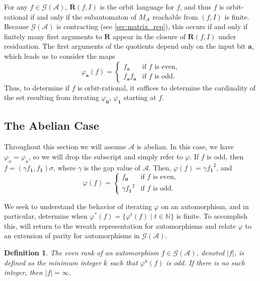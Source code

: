 \documentclass[12pt, letterpaper]{article}
\newcommand{\N}{\mathbb N}
\newcommand{\A}{\mathcal A}
\newcommand{\ch}[1]{\mathbf{#1}}
\newcommand{\res}[2]{{{#1}_{\ch{#2}}}}
\newcommand{\gp}{\mathcal G}
\newcommand{\R}{\mathbf R}
\newcommand{\f}[1]{\overline{#1}}
\newcommand{\rk}[1]{\left|#1\right|}
\newtheorem{defn}[thm]{Definition}
\begin{document}
For any $f \in \gp(\A)$, $\R(f, I)$ is the orbit language for $f$, and thus $f$
is orbit-rational if and only if the subautomaton of $M_\A$ reachable from $(f,
I)$ is finite. Because $\gp(\A)$ is contracting (see \cref{sec:matrix_rep}),
this occurs if and only if finitely many first arguments to $\R$ appear in the
closure of $\R(f, I)$ under residuation. The first arguments of the quotients
depend only on the input bit $\ch{a}$, which leads us to consider the maps
\[
    \varphi_{\ch{a}}(f) = \begin{cases}
        \res{f}{a} & \text{if $f$ is even,}\\
        \res{f}{a}\res{f}{\f{a}} & \text{if $f$ is odd.}
    \end{cases}
\]
Thus, to determine if $f$ is orbit-rational, it suffices to determine the
cardinality of the set resulting from iterating $\varphi_{\ch{0}}$,
$\varphi_{\ch{1}}$ starting at $f$.


\subsection{The Abelian Case}\label{sec:abelian-orbit}
Throughout this section we will assume $\A$ is abelian. In this case, we have
$\varphi_a = \varphi_{\f{a}}$, so we will drop the subscript and simply refer
to $\varphi$. If $f$ is odd, then $f = (\gamma \res{f}{1}, \res{f}{1}) \sigma$,
where $\gamma$ is the gap value of $\A$.  Then, $\varphi(f) = \gamma
\res{f}{1}^2$, and
\begin{equation}\label{eq:abelianorbitresid}
    \varphi(f) = \begin{cases}
        \res{f}{0} & \text{if $f$ is even,}\\
        \gamma \res{f}{1}^2 & \text{if $f$ is odd.}
    \end{cases}
\end{equation}

We seek to understand the behavior of iterating $\varphi$ on an automorphism,
and in particular, determine when $\varphi^*(f) = \{\varphi^t (f) \mid t \in
\N\}$ is finite.  To accomplish this, will return to the wreath representation
for automorphisms and relate $\varphi$ to an extension of parity for
automorphisms in $\gp(\A)$.

\begin{defn}
    The even rank of an automorphism $f \in \gp(\A)$, denoted $\rk{f}$, is
    defined as the minimum integer $k$ such that $\varphi^k(f)$ is odd. If
    there is no such integer, then $\rk{f} = \infty$.
\end{defn}
\end{document}
